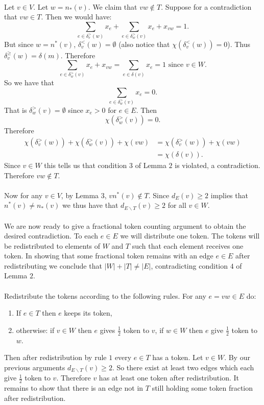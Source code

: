 \documentclass[letterpaper,12pt,oneside,onecolumn]{article}
\begin{document}
\paragraph{}
Let $v \in V$. Let $w = n_*(v)$. We claim that $vw \not\in T$. Suppose for a contradiction that $vw \in T$. Then we would have:
$$  \sum_{e \in \delta_v^>(w)} x_e + \sum_{e \in \delta_w^>(v)} x_e + x_{vw} = 1. $$
But since $w=n^*(v)$, $\delta_v^<(w) = \emptyset$ (also notice that $\chi(\delta_v^<(w)) = 0$). Thus $\delta_v^\geq(w) = \delta(m)$. Therefore
$$\sum_{e \in \delta_w^>(v)} x_e + x_{vw} = \sum_{e \in \delta(v)} x_e = 1 \text{ since $v \in W$}. $$
So we have that $$ \sum_{e \in \delta_w^>(v)} x_e = 0. $$ That is $\delta_w^>(v) = \emptyset$ since $x_e > 0$ for $e \in E$. Then $$\chi(\delta_w^>(v)) = 0.$$
Therefore
\begin{align*}
\chi(\delta_v^>(w)) + \chi(\delta_w^>(v)) + \chi(vw) &= \chi(\delta_v^>(w)) + \chi(vw) \\
&= \chi(\delta(v)).
\end{align*}
Since $v \in W$ this tells us that condition $3$ of Lemma $2$ is violated, a contradiction. Therefore $vw \not\in T$.
\paragraph{}
Now for any $v \in V$, by Lemma $3$, $vn^*(v) \not\in T$. Since $d_E(v) \geq 2$ implies that $n^*(v) \neq n_*(v)$ we thus have that $d_{E\backslash T}(v) \geq 2$ for all $v \in W$.
\paragraph{}
We are now ready to give a fractional token counting argument to obtain the desired contradiction. To each $e \in E$ we will distribute one token. The tokens will be redistributed to elements of $W$ and $T$ such that each element receives one token. In showing that some fractional token remains with an edge $e \in E$ after redistributing we conclude that $|W| + |T| \neq |E|$, contradicting condition $4$ of Lemma $2$.
\paragraph{}
Redistribute the tokens according to the following rules. For any $e=vw \in E$ do:
\begin{enumerate}
\item If $e \in T$ then $e$ keeps its token,
\item otherwise:
\subitem if $v \in W$ then $e$ gives $\frac{1}{2}$ token to $v$,
\subitem if $w \in W$ then $e$ give $\frac{1}{2}$ token to $w$.
\end{enumerate}
Then after redistribution by rule $1$ every $e \in T$ has a token. Let $v \in W$. By our previous arguments $d_{E\backslash T}(v) \geq 2$. So there exist at least two edges which each give $\frac{1}{2}$ token to $v$. Therefore $v$ has at least one token after redistribution. It remains to show that there is an edge not in $T$ still holding some token fraction after redistribution.
\end{document}
